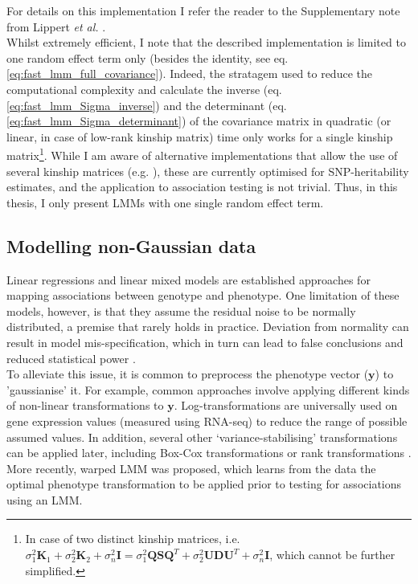 For details on this implementation I refer the reader to the Supplementary note from Lippert \textit{et al.} \cite{lippert2011fast}. \\

Whilst extremely efficient, I note that the described implementation is limited to one random effect term only (besides the identity, see eq. \eqref{eq:fast_lmm_full_covariance}).
Indeed, the stratagem used to reduce the computational complexity and calculate the inverse (eq. \eqref{eq:fast_lmm_Sigma_inverse}) and the determinant (eq. \eqref{eq:fast_lmm_Sigma_determinant}) of the covariance matrix in quadratic (or linear, in case of low-rank kinship matrix) time only works for a single kinship matrix\footnote{In case of two distinct kinship matrices, i.e. $\sigma_1^2\mathbf{K}_1 + \sigma_2^2\mathbf{K}_2 + \sigma_n^2\mathbf{I} = \sigma_1^2\mathbf{Q}\mathbf{S}\mathbf{Q}^T + \sigma_2^2\mathbf{U}\mathbf{D}\mathbf{U}^T + \sigma_n^2\mathbf{I}$, which cannot be further simplified.}.
While I am aware of alternative implementations that allow the use of several kinship matrices (e.g. \cite{pazokitoroudi2020efficient}), these are currently optimised for SNP-heritability estimates, and the application to association testing is not trivial.
Thus, in this thesis, I only present LMMs with one single random effect term.




\subsection{Modelling non-Gaussian data}
\label{sec:non_gaussian}

Linear regressions and linear mixed models are established approaches for mapping associations between genotype and phenotype. 
One limitation of these models, however, is that they assume the residual noise to be normally distributed, a premise that rarely holds in practice. 
Deviation from normality can result in model mis-specification, which in turn can lead to false conclusions and reduced statistical power \cite{mcculloch2014generalized}.  \\

To alleviate this issue, it is common to preprocess the phenotype vector ($\mathbf{y}$) to 'gaussianise' it. 
For example, common approaches involve applying different kinds of non-linear transformations to $\mathbf{y}$. 
Log-transformations are universally used on gene expression values (measured using RNA-seq) to reduce the range of possible assumed values.
In addition, several other `variance-stabilising' transformations can be applied later, including Box-Cox transformations \cite{box1964analysis} or rank transformations \cite{zhou2014efficient}.
More recently, warped LMM \cite{fusi2014warped} was proposed, which learns from the data the optimal phenotype transformation to be applied prior to testing for associations using an LMM. 
\\

